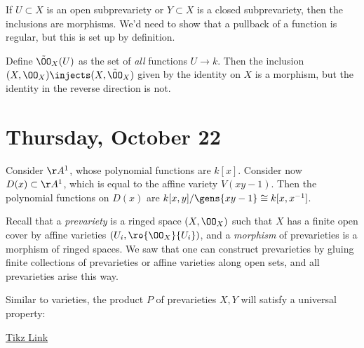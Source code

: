 \begin{remark}

If \(U\subset X\) is an open subprevariety or \(Y\subset X\) is a closed
subprevariety, then the inclusions are morphisms. We'd need to show that
a pullback of a function is regular, but this is set up by definition.

\end{remark}

\begin{remark}

Define \(\tilde \OO_X(U)\) as the set of \emph{all} functions
\(U\to k\). Then the inclusion \((X, \OO_X) \injects (X, \tilde \OO_X)\)
given by the identity on \(X\) is a morphism, but the identity in the
reverse direction is not.

\end{remark}

\hypertarget{thursday-october-22}{%
\section{Thursday, October 22}\label{thursday-october-22}}

\begin{example}

Consider \(\AA^1\), whose polynomial functions are \(k[x]\). Consider
now \(D(x) \subset \AA^1\), which is equal to the affine variety
\(V(xy-1)\). Then the polynomial functions on \(D(x)\) are
\(k[x, y] / \gens{xy-1} \cong k[x, x^{-1} ]\).

\end{example}

Recall that a \emph{prevariety} is a ringed space \((X, \OO_X)\) such
that \(X\) has a finite open cover by affine varieties
\((U_i, \ro{\OO_X}{U_i})\), and a \emph{morphism} of prevarieties is a
morphism of ringed spaces. We saw that one can construct prevarieties by
gluing finite collections of prevarieties or affine varieties along open
sets, and all prevarieties arise this way.

Similar to varieties, the product \(P\) of prevarieties \(X, Y\) will
satisfy a universal property:

\href{https://tikzcd.yichuanshen.de/\#N4Igdg9gJgpgziAXAbVABwnAlgFyxMJZABgBpiBdUkANwEMAbAVxiRAAUQBfU9TXfIRQBGUsKq1GLNgC1uvEBmx4CRAExiJ9Zq0QgAGvL7LBRUWq1TdIAJrcJMKAHN4RUADMAThAC2SUSA4EEgAzDwe3n6IAUFIauEgXr7+1LGIZCAMWGDWUHRwABaOINTa0noAOhUwAB5YcDgICUlRGWkaIABGMGBQoRll1lVoWAD6hs2RSG3BiCHU3b1IALQhA1Zsw2N21Ax03Qzs-CpCIJ5YTgU49lxAA}{Tikz
Link}

